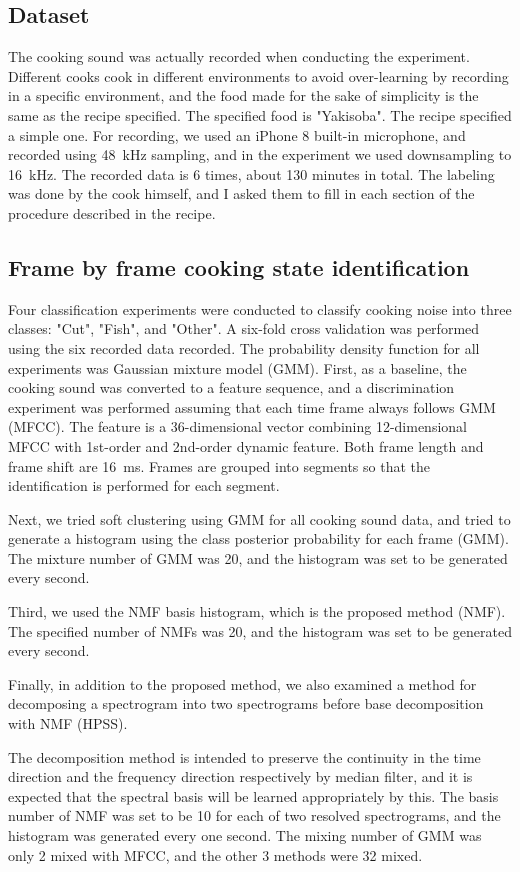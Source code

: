 \documentclass[sigchi]{acmart}
\begin{document}
\subsection{Dataset}
The cooking sound was actually recorded when conducting the experiment. Different cooks cook in different environments to avoid over-learning by recording in a specific environment, and the food made for the sake of simplicity is the same as the recipe specified.
The specified food is "Yakisoba". The recipe specified a simple one.
For recording, we used an iPhone 8 built-in microphone, and recorded using \SI{48}{kHz} sampling, and in the experiment we used downsampling to \SI{16}{kHz}. The recorded data is 6 times, about 130 minutes in total.
The labeling was done by the cook himself, and I asked them to fill in each section of the procedure described in the recipe.

\subsection{Frame by frame cooking state identification}
Four classification experiments were conducted to classify cooking noise into three classes: "Cut", "Fish", and "Other". A six-fold cross validation was performed using the six recorded data recorded. The probability density function for all experiments was Gaussian mixture model (GMM).
First, as a baseline, the cooking sound was converted to a feature sequence, and a discrimination experiment was performed assuming that each time frame always follows GMM (MFCC).
The feature is a 36-dimensional vector combining 12-dimensional MFCC with 1st-order and 2nd-order dynamic feature. Both frame length and frame shift are \SI{16}{ms}. Frames are grouped into segments so that the identification is performed for each segment.

Next, we tried soft clustering using GMM for all cooking sound data, and tried to generate a histogram using the class posterior probability for each frame (GMM). The mixture number of GMM was 20, and the histogram was set to be generated every second.

Third, we used the NMF basis histogram, which is the proposed method (NMF). The specified number of NMFs was 20, and the histogram was set to be generated every second.

Finally, in addition to the proposed method, we also examined a method for decomposing a spectrogram into two spectrograms before base decomposition with NMF (HPSS).

The decomposition method is intended to preserve the continuity in the time direction and the frequency direction respectively by median filter, and it is expected that the spectral basis will be learned appropriately by this.
The basis number of NMF was set to be 10 for each of two resolved spectrograms, and the histogram was generated every one second.
The mixing number of GMM was only 2 mixed with MFCC, and the other 3 methods were 32 mixed.
\end{document}
